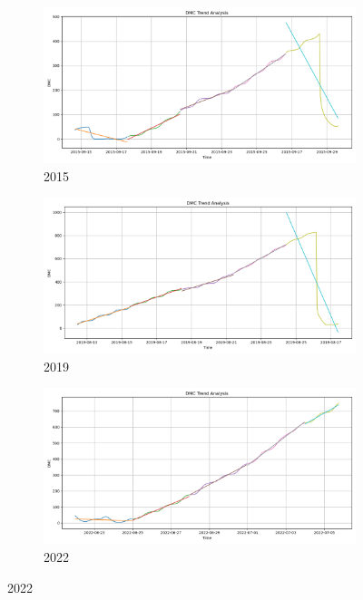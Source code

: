 \begin{figure}[h]
	\centering
	\caption{All-time DMC polyfit trend}
	\begin{subfigure}{0.3\textwidth}
		\centering
		\includegraphics[width=\textwidth]{graphs/polyfit_trend_analysis/2015_15days_BLOCK3days_dmc_trend_analysis.png}
		\caption{2015}
		\label{fig:2015_polyfit_DMC_alltime}
	\end{subfigure}
	\hfill
	\begin{subfigure}{0.3\textwidth}
		\centering
		\includegraphics[width=\textwidth]{graphs/polyfit_trend_analysis/2019_15days_BLOCK3days_dmc_trend_analysis.png}
		\caption{2019}
		\label{fig:2019_polyfit_DMC_alltime}
	\end{subfigure}
	\hfill
	\begin{subfigure}{0.3\textwidth}
		\centering
		\includegraphics[width=\textwidth]{graphs/polyfit_trend_analysis/2022_15days_BLOCK3days_dmc_trend_analysis.png}
		\caption{2022}
		\label{fig:2022_polyfit_DMC_alltime}
	\end{subfigure}
	
	\label{fig:DMC_polyfit_alltime}
\end{figure}


